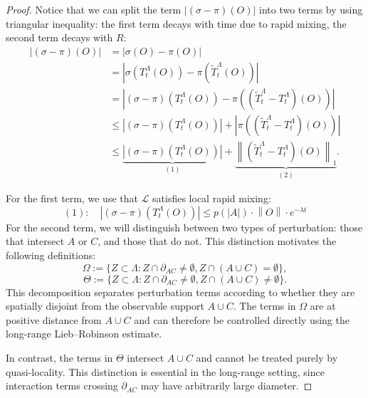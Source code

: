 \documentclass[10pt,a4paper]{amsart}
\newcommand{\Li}{\mathcal{L}}
\newcommand{\T}{T^\Lambda}
\newcommand{\TT}{\widetilde{T}^\Lambda}
\newcommand{\abs}[1]{\left \vert#1\right\vert}
\newcommand{\norm}[1]{\left\lVert#1\right\rVert}
\newcommand{\normm}[2]{\left\lVert#1\right\rVert_{#2}}
\begin{document}
\begin{proof}
    Notice that we can split the term $\abs{(\sigma-\pi)(O)}$ into two terms by using triangular inequality: the first term decays with time due to rapid mixing, the second term decays with $R$:
  \begin{align}
\abs{(\sigma-\pi)(O)} &= \abs{\sigma(O)-\pi(O)} \label{eq:diferenceStates} \\
&= \abs{\sigma(\T_t(O))-\pi(\TT_t(O))} \nonumber\\
&= \abs{(\sigma-\pi)(\T_t(O))-\pi((\TT_t-\T_t)(O))} \nonumber\\
&\le \abs{(\sigma-\pi)(\T_t(O))}+\abs{\pi((\TT_t-\T_t)(O))} \nonumber\\
&\le \underbrace{\abs{(\sigma-\pi)(\T_t(O))}}_{(1)}+\underbrace{\normm{(\TT_t-\T_t)(O)}{1}}_{(2)}. \nonumber
\end{align}


    For the first term, we use that $\Li$ satisfies local rapid mixing:
     \begin{equation*}
        (1):\quad \abs{(\sigma-\pi)(\T_t(O))} \leq p(\abs{A})\cdot   \norm{O} \cdot e^{-\lambda t}
     \end{equation*}
     For the second term, we will distinguish between two types of perturbation: those that intersect $A$ or $C$, and those that do not. This distinction motivates the following definitions:
     \begin{equation}
         \Omega:=\{ Z\subset \Lambda : Z\cap \partial_{AC}\neq \emptyset,Z\cap(A\cup C)= \emptyset\},
         \label{eq:Omega}
     \end{equation}
     \begin{equation}
         \Theta := \{ Z\subset \Lambda : Z\cap \partial_{AC}\neq \emptyset,Z\cap(A\cup C)\neq \emptyset\}.
         \label{eq:Theta}
     \end{equation}
     This decomposition separates perturbation terms according to whether
    they are spatially disjoint from the observable support $A\cup C$.
    The terms in $\Omega$ are at positive distance from $A\cup C$ and can
    therefore be controlled directly using the long-range Lieb–Robinson
    estimate. 
    
    In contrast, the terms in $\Theta$ intersect $A\cup C$ and cannot be
    treated purely by quasi-locality. This distinction is essential in the
    long-range setting, since interaction terms crossing $\partial_{AC}$
    may have arbitrarily large diameter.
    

\end{proof}
\end{document}
